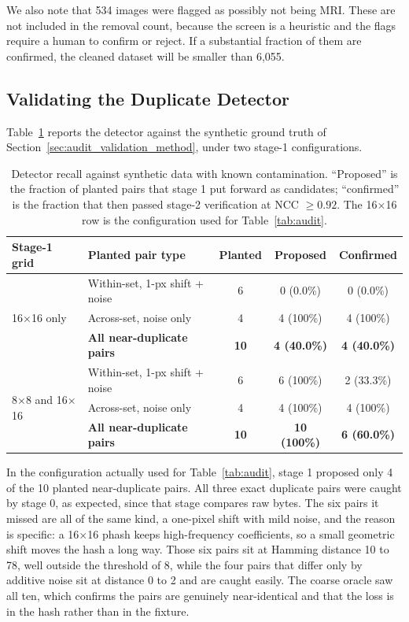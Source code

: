 \documentclass[11pt]{article}
\begin{document}
We also note that 534 images were flagged as possibly not being MRI. These are not included in the removal count, because the screen is a heuristic and the flags require a human to confirm or reject. If a substantial fraction of them are confirmed, the cleaned dataset will be smaller than 6,055.

\subsection{Validating the Duplicate Detector}
\label{sec:audit_validation_results}

Table~\ref{tab:audit_validation} reports the detector against the synthetic ground truth of Section~\ref{sec:audit_validation_method}, under two stage-1 configurations.

\begin{table}[htbp]
\centering
\caption{Detector recall against synthetic data with known contamination. ``Proposed'' is the fraction of planted pairs that stage 1 put forward as candidates; ``confirmed'' is the fraction that then passed stage-2 verification at NCC $\geq 0.92$. The 16$\times$16 row is the configuration used for Table~\ref{tab:audit}.}
\label{tab:audit_validation}
\small
\begin{tabular*}{\textwidth}{@{\extracolsep{\fill}}llccc@{}}
\toprule
\textbf{Stage-1 grid} & \textbf{Planted pair type} & \textbf{Planted} & \textbf{Proposed} & \textbf{Confirmed} \\
\midrule
\multirow{3}{*}{16$\times$16 only} & Within-set, 1-px shift + noise & 6 & 0 (0.0\%) & 0 (0.0\%) \\
 & Across-set, noise only & 4 & 4 (100\%) & 4 (100\%) \\
 & \textbf{All near-duplicate pairs} & \textbf{10} & \textbf{4 (40.0\%)} & \textbf{4 (40.0\%)} \\
\midrule
\multirow{3}{*}{8$\times$8 and 16$\times$16} & Within-set, 1-px shift + noise & 6 & 6 (100\%) & 2 (33.3\%) \\
 & Across-set, noise only & 4 & 4 (100\%) & 4 (100\%) \\
 & \textbf{All near-duplicate pairs} & \textbf{10} & \textbf{10 (100\%)} & \textbf{6 (60.0\%)} \\
\bottomrule
\end{tabular*}
\end{table}

In the configuration actually used for Table~\ref{tab:audit}, stage 1 proposed only 4 of the 10 planted near-duplicate pairs. All three exact duplicate pairs were caught by stage 0, as expected, since that stage compares raw bytes. The six pairs it missed are all of the same kind, a one-pixel shift with mild noise, and the reason is specific: a 16$\times$16 phash keeps high-frequency coefficients, so a small geometric shift moves the hash a long way. Those six pairs sit at Hamming distance 10 to 78, well outside the threshold of 8, while the four pairs that differ only by additive noise sit at distance 0 to 2 and are caught easily. The coarse oracle saw all ten, which confirms the pairs are genuinely near-identical and that the loss is in the hash rather than in the fixture.
\end{document}
